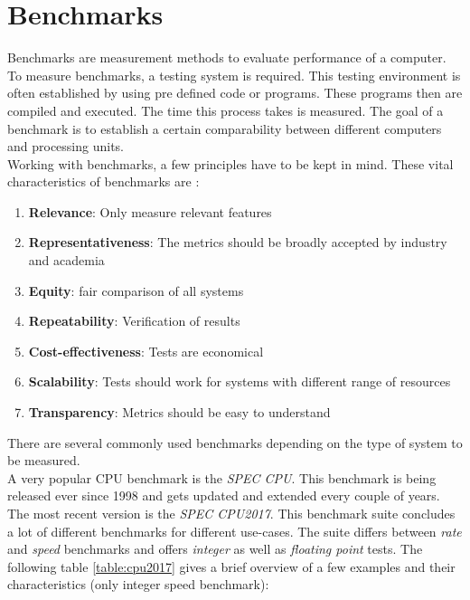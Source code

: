 \section{Benchmarks}
Benchmarks are measurement methods to evaluate performance of a computer. To measure benchmarks, a testing system is required. This testing environment is often established by using pre defined code or programs. These programs then are compiled and executed. The time this process takes is measured. The goal of a benchmark is to establish a certain comparability between different computers and processing units. \cite{gessler2014}\\
Working with benchmarks, a few principles have to be kept in mind. These vital characteristics of benchmarks are \cite{kounev2020systems}:
\begin{enumerate}
	\item \textbf{Relevance}: Only measure relevant features
	\item \textbf{Representativeness}: The metrics should be broadly accepted by industry and academia
	\item \textbf{Equity}: fair comparison of all systems
	\item \textbf{Repeatability}: Verification of results
	\item \textbf{Cost-effectiveness}: Tests are economical
	\item \textbf{Scalability}: Tests should work for systems with different range of resources
	\item \textbf{Transparency}: Metrics should be easy to understand
\end{enumerate}
There are several commonly used benchmarks depending on the type of system to be measured.\\
A very popular CPU benchmark is the \textit{SPEC CPU}. This benchmark is being released ever since 1998 and gets updated and extended every couple of years. The most recent version is the \textit{SPEC CPU2017}. This benchmark suite concludes a lot of different benchmarks for different use-cases. The suite differs between \textit{rate} and \textit{speed} benchmarks and offers \textit{integer} as well as \textit{floating point} tests. The following table \ref{table:cpu2017} gives a brief overview of a few examples and their characteristics (only integer speed benchmark):
\begin{table}[H]
	\setlength\arrayrulewidth{2pt}
	\centering
	\caption{SPEC CPU2017 benchmark suite \cite{kounev2020systems}}
	\label{table:cpu2017}
\end{table}


